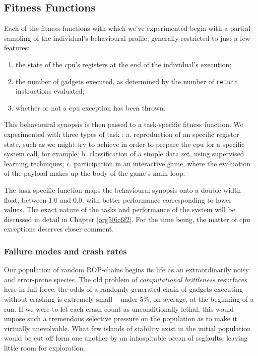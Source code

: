 \documentclass[12pt,glossary]{dalthesis}
\begin{document}
\subsection{Fitness Functions}
\label{sec:orgfb4f858}
\label{org07376ad}

Each of the fitness functions with which we've experimented begin with a partial
sampling of the individual's behavioural profile, generally restricted to just
a few features:
\begin{enumerate}
\item the state of the \gls{cpu}'s registers at the end of the individual's execution;
\item the number of gadgets executed, as determined by the number of \texttt{return}
instructions evaluated;
\item whether or not a \gls{cpu} exception has been thrown.
\end{enumerate}

This behavioural synopsis is then passed to a task-specific fitness function. We
experimented with three types of task : 
  a. reproduction of an specific register state, such as we might try to achieve
     in order to prepare the \gls{cpu} for a specific system call, for example;
  b. classification of a simple data set, using supervised learning techniques;
  c. participation in an interactive game, where the evaluation of the payload
     makes up the body of the game's main loop.

The task-specific function maps the behavioural synopsis onto a double-width float,
between 1.0 and 0.0, with better performance corresponding to lower values. 
The exact nature of the tasks and performance of the system will be discussed in
detail in Chapter \ref{org5f6c6f2}. For the time being, the matter of \gls{cpu}
exceptions deserves closer comment.

\subsubsection{Failure modes and crash rates}
\label{sec:org9b7897b}

Our population of random ROP-chains begins its life as an extraordinarily noisy
and error-prone species. The old problem of \emph{computational brittleness}  resurfaces here in full force: the odds of a
randomly generated chain of gadgets executing without crashing is extremely
small  -- under 5\%, on average, at the
beginning of a run.  If we were to let each crash count as unconditionally
lethal, this would impose such a tremendous selective pressure on the population
as to make it virtually unevolvable. What few islands of stability exist in the
initial population would be cut off form one another by an inhospitable ocean of
segfaults, leaving little room for exploration.
\end{document}
